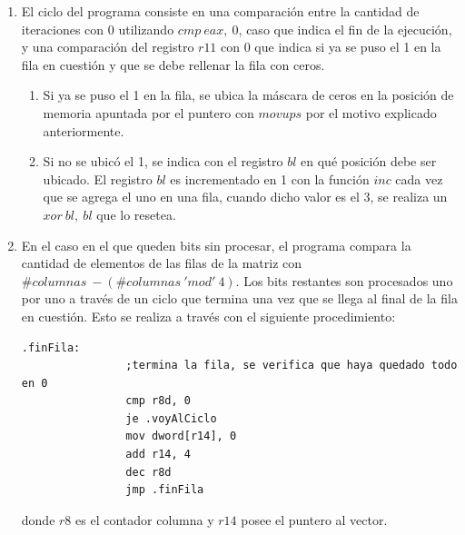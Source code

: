 \documentclass[10pt, a4paper]{article}
\begin{document}
\begin{enumerate}
\item El ciclo del programa consiste en una comparación entre la cantidad de iteraciones con 0 utilizando $cmp\ eax,\ 0$, caso que indica el fin de la ejecución, y una comparación del registro $r11$ con 0 que indica si ya se puso el 1 en la fila en cuestión y que se debe rellenar la fila con ceros.
\begin{enumerate}
\item Si ya se puso el 1 en la fila, se ubica la máscara de ceros en la posición de memoria apuntada por el puntero con $movups$ por el motivo explicado anteriormente.
\item Si no se ubicó el 1, se indica con el registro $bl$ en qué posición debe ser ubicado. El registro $bl$ es incrementado en 1 con la función $inc$ cada vez que se agrega el uno en una fila, cuando dicho valor es el 3, se realiza un $xor\ bl,\ bl$ que lo resetea.
\end{enumerate}
\item En el caso en el que queden bits sin procesar, el programa compara la cantidad de elementos de las filas de la matriz con $\#columnas\ - (\#columnas\ 'mod'\ 4)$. 
Los bits restantes son procesados uno por uno a través de un ciclo que termina una vez que se llega al final de la fila en cuestión. Esto se realiza a través con el siguiente procedimiento:
\begin{verbatim}
.finFila:
                ;termina la fila, se verifica que haya quedado todo en 0
                cmp r8d, 0
                je .voyAlCiclo
                mov dword[r14], 0
                add r14, 4
                dec r8d
                jmp .finFila
\end{verbatim}
donde $r8$ es el contador columna y $r14$ posee el puntero al vector.
\end{enumerate}\newline
\end{document}
